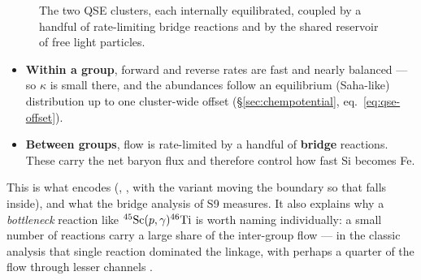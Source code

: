\begin{figure}[H]
\centering
{}
\caption{The two QSE clusters, each internally equilibrated, coupled by a
handful of rate-limiting bridge reactions and by the shared reservoir of free
light particles.}
\label{fig:clusters}
\end{figure}

\begin{itemize}
\item \textbf{Within a group}, forward and reverse rates are fast and nearly
      balanced --- so $\kappa$ is small there, and the abundances follow an
      equilibrium (Saha-like) distribution up to one cluster-wide offset
      (\S\ref{sec:chempotential}, eq.~\eqref{eq:qse-offset}).
\item \textbf{Between groups}, flow is rate-limited by a handful of
      \textbf{bridge} reactions. These carry the net baryon flux and therefore
      control how fast Si becomes Fe.
\end{itemize}

This is what  encodes (,
, with the  variant moving the boundary so that
 falls inside), and what the bridge analysis of S9 measures. It also
explains why a \emph{bottleneck} reaction like
$\nuc{Sc}{45}(p,\gamma)\nuc{Ti}{46}$ is worth naming individually: a small
number of reactions carry a large share of the inter-group flow --- in the
classic analysis that single reaction dominated the linkage, with perhaps a
quarter of the flow through lesser channels \citep[][as quoted by
\citealt{hix1996}]{wac1973}.

